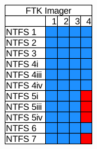 \begin{figure}[h]
\begin{subfigure}{0.17\linewidth}
        \includegraphics[width=\linewidth]{fig/ftk_results_ntfs.png}
    \end{subfigure}~~
    \begin{subfigure}{0.17\linewidth}

\end{subfigure}
\end{figure}
